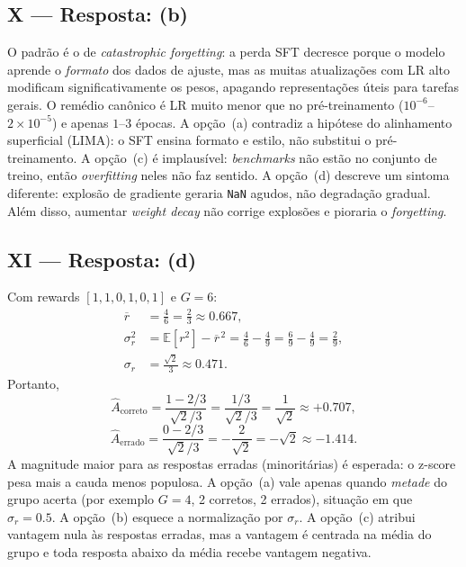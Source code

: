 \documentclass{dlproblemset}
\begin{document}
\subsection*{X — Resposta: (b)}
O padrão é o de \textit{catastrophic forgetting}: a perda SFT
decresce porque o modelo aprende o \emph{formato} dos dados de ajuste,
mas as muitas atualizações com LR alto modificam significativamente os
pesos, apagando representações úteis para tarefas gerais. O remédio
canônico é LR muito menor que no pré-treinamento ($10^{-6}$–$2\times 10^{-5}$)
e apenas $1$–$3$ épocas.
A opção~(a) contradiz a hipótese do alinhamento superficial (LIMA):
o SFT ensina formato e estilo, não substitui o pré-treinamento.
A opção~(c) é implausível: \textit{benchmarks} não estão no conjunto
de treino, então \textit{overfitting} neles não faz sentido.
A opção~(d) descreve um sintoma diferente: explosão de gradiente geraria
\texttt{NaN} agudos, não degradação gradual. Além disso, aumentar
\textit{weight decay} não corrige explosões e pioraria o
\textit{forgetting}.

\subsection*{XI — Resposta: (d)}
Com rewards $[1,1,0,1,0,1]$ e $G = 6$:
\begin{align*}
  \overline{r} &= \tfrac{4}{6} = \tfrac{2}{3} \approx 0.667, \\
  \sigma_r^2 &= \mathbb{E}[r^2] - \overline{r}^{\,2} = \tfrac{4}{6} - \tfrac{4}{9}
             = \tfrac{6}{9} - \tfrac{4}{9} = \tfrac{2}{9}, \\
  \sigma_r   &= \tfrac{\sqrt{2}}{3} \approx 0.471.
\end{align*}
Portanto,
\[
  \hat{A}_{\text{correto}} = \frac{1 - 2/3}{\sqrt{2}/3} = \frac{1/3}{\sqrt{2}/3}
    = \frac{1}{\sqrt{2}} \approx +0.707,
\]
\[
  \hat{A}_{\text{errado}} = \frac{0 - 2/3}{\sqrt{2}/3}
    = -\frac{2}{\sqrt{2}} = -\sqrt{2} \approx -1.414.
\]
A magnitude maior para as respostas erradas (minoritárias) é esperada: o
z-score pesa mais a cauda menos populosa.
A opção~(a) vale apenas quando \emph{metade} do grupo acerta (por exemplo
$G = 4$, 2 corretos, 2 errados), situação em que $\sigma_r = 0.5$.
A opção~(b) esquece a normalização por $\sigma_r$.
A opção~(c) atribui vantagem nula às respostas erradas, mas a vantagem é centrada na média do grupo e toda resposta abaixo da média recebe vantagem negativa.

\end{document}
